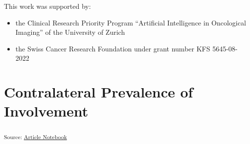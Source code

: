 \documentclass[
  sn-mathphys-num,
]{sn-jnl}
\providecommand{\tightlist}{%
  \setlength{\itemsep}{0pt}\setlength{\parskip}{0pt}}\usepackage{longtable,booktabs,array}
\begin{document}
This work was supported by:

\begin{itemize}
\tightlist
\item
  the Clinical Research Priority Program ``Artificial Intelligence in
  Oncological Imaging'' of the University of Zurich
\item
  the Swiss Cancer Research Foundation under grant number KFS
  5645-08-2022
\end{itemize}

\section{Contralateral Prevalence of
Involvement}\label{contralateral-prevalence-of-involvement}

\textsubscript{Source:
\href{https://rmnldwg.github.io/bilateral-paper/manuscript-preview.html}{Article
Notebook}}
\end{document}
